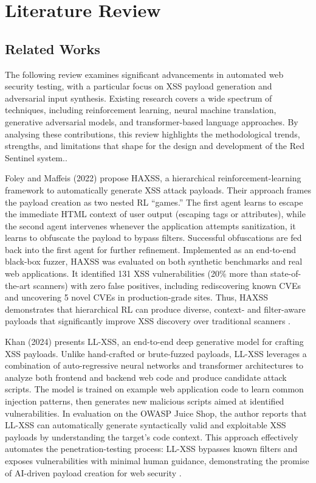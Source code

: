 \chapter{Literature Review }
\section{Related Works}
The following review examines significant advancements in automated web security testing, with a particular focus on XSS payload generation and adversarial input synthesis. Existing research covers a wide spectrum of techniques, including reinforcement learning, neural machine translation, generative adversarial models, and transformer-based language approaches. By analysing these contributions, this review highlights the methodological trends, strengths, and limitations that shape for the design and development of the Red Sentinel system..

Foley and Maffeis (2022) propose HAXSS, a hierarchical reinforcement-learning framework to automatically generate XSS attack payloads. Their approach frames the payload creation as two nested RL ``games.'' The first agent learns to escape the immediate HTML context of user output (escaping tags or attributes), while the second agent intervenes whenever the application attempts sanitization, it learns to obfuscate the payload to bypass filters. Successful obfuscations are fed back into the first agent for further refinement. Implemented as an end-to-end black-box fuzzer, HAXSS was evaluated on both synthetic benchmarks and real web applications. It identified 131 XSS vulnerabilities (20\% more than state-of-the-art scanners) with zero false positives, including rediscovering known CVEs and uncovering 5 novel CVEs in production-grade sites. Thus, HAXSS demonstrates that hierarchical RL can produce diverse, context- and filter-aware payloads that significantly improve XSS discovery over traditional scanners \cite{foley2022haxss}.

Khan (2024) presents LL-XSS, an end-to-end deep generative model for crafting XSS payloads. Unlike hand-crafted or brute-fuzzed payloads, LL-XSS leverages a combination of auto-regressive neural networks and transformer architectures to analyze both frontend and backend web code and produce candidate attack scripts. The model is trained on example web application code to learn common injection patterns, then generates new malicious scripts aimed at identified vulnerabilities. In evaluation on the OWASP Juice Shop, the author reports that LL-XSS can automatically generate syntactically valid and exploitable XSS payloads by understanding the target's code context. This approach effectively automates the penetration-testing process: LL-XSS bypasses known filters and exposes vulnerabilities with minimal human guidance, demonstrating the promise of AI-driven payload creation for web security \cite{khan2024llxss}.

